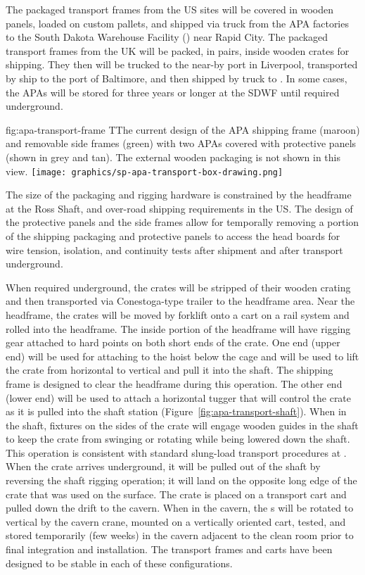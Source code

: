 The packaged transport frames from the US sites will be covered in wooden panels, loaded on custom pallets, and shipped via truck from the APA factories to the South Dakota Warehouse Facility () near Rapid City. The packaged transport frames from the UK will be packed, in pairs, inside wooden crates for shipping. They then will be trucked to the near-by port in Liverpool, transported by ship to the port of Baltimore, and then shipped by truck to . In some cases, the APAs will be stored for three years or longer at the SDWF until required underground. 

\begin{dunefigure}{fig:apa-transport-frame}
{TThe current design of the APA shipping frame (maroon) and removable side frames (green) with two APAs covered with protective panels (shown in grey and tan). The external wooden packaging is not shown in this view.}  
\texttt{[image: graphics/sp-apa-transport-box-drawing.png]} 
\end{dunefigure}

The size of the packaging and rigging hardware is constrained by the headframe at the Ross Shaft, and over-road shipping requirements in the US. The design of the protective panels and the side frames allow for temporally removing a portion of the shipping packaging and protective panels to access the  head boards for wire tension, isolation, and continuity tests after shipment and after transport underground. 

When required underground, the crates will be stripped of their wooden crating and then transported via Conestoga-type trailer to the headframe area. Near the headframe, the crates will be moved by forklift onto a cart on a rail system and rolled into the headframe. The inside portion of the headframe will have rigging gear attached to hard points on both short ends of the crate. One end (upper end) will be used for attaching to the hoist below the cage and will be used to lift the crate from horizontal to vertical and pull it into the shaft. The shipping frame is designed to clear the headframe during this operation. The other end (lower end) will be used to attach a horizontal tugger that will control the crate as it is pulled into the shaft station (Figure~\ref{fig:apa-transport-shaft}). When in the shaft, fixtures on the sides of the crate will engage wooden guides in the shaft to keep the crate from swinging or rotating while being lowered down the shaft. This operation is consistent with standard slung-load transport procedures at . When the crate arrives underground, it will be pulled out of the shaft by reversing the shaft rigging operation; it will land on the opposite long edge of the crate that was used on the surface. The crate is placed on a transport cart and pulled down the drift to the cavern. When in the cavern, the s will be rotated to vertical by the cavern crane, mounted on a vertically oriented cart, tested, and stored temporarily (few weeks) in the cavern adjacent to the clean room prior to final integration and installation. The transport frames and carts have been designed to be stable in each of these configurations. 

